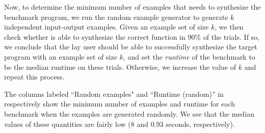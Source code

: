 Now, to determine the minimum number of examples that \sys needs to
synthesize the benchmark program, we run the random example generator
to generate $k$ independent input-output examples. Given an example
set of size $k$, we then check whether \sys is able to synthesize the
correct function in 90\% of the trials.  If so, we conclude that the
lay user should be able to successfully synthesize the target program
with an example set of size $k$, and set the {\em runtime} of the
benchmark to be the median runtime on these trials. Otherwise, we
increase the value of $k$ and repeat this process.


\begin{comment}
Not all example sets generated as above would lead to the known
implementation, as there may be a simpler program that fits the
examples. Hence, for each value of $k$, we repeatedly ran the example
generator and \sys. For each $k$, if \sys did not
synthesize the correct function in 90\% of the trials, then we
concluded that the lay user would not be able to successfully
synthesize the target program with an example set of size $k$. In this
case we increased the value of $k$ and repeated the
process. Otherwise, we considered $k$ to be the {\em minimum number of
  random examples} that \sys needed for the benchmark, and calculated
the {\em median random runtime} of \sys for synthesis in trials
involving examples of size $k$.
\end{comment}



The columns labeled ``Random examples" and ``Runtime (random)'' in
 respectively show the minimum number of examples
and
runtime for each benchmark when the examples are generated randomly.
We see that the median values of these quantities are fairly
low (8 and 0.93 seconds, respectively).



